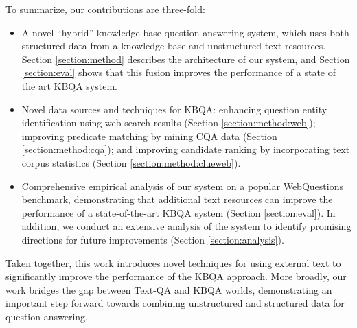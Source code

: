 To summarize, our contributions are three-fold:
\begin{itemize} %
\item A novel ``hybrid'' knowledge base question answering system, which uses both structured data from a knowledge base and unstructured text resources. Section \ref{section:method} describes the architecture of our system, and Section \ref{section:eval} shows that this fusion improves the performance of a state of the art KBQA system.
\item Novel data sources and techniques for KBQA: enhancing question entity identification using web search results (Section \ref{section:method:web}); improving predicate matching by mining CQA data (Section \ref{section:method:cqa}); and improving candidate ranking by incorporating text corpus statistics (Section \ref{section:method:clueweb}).
\item Comprehensive empirical analysis of our system on a popular WebQuestions benchmark, demonstrating that additional text resources can improve the performance of a state-of-the-art KBQA system (Section \ref{section:eval}). In addition, we conduct an extensive analysis of the system to identify promising directions for future improvements (Section \ref{section:analysis}).
\end{itemize}

Taken together, this work introduces novel techniques for using external text to significantly improve the performance of the KBQA approach.
More broadly, our work bridges the gap between Text-QA and KBQA worlds, demonstrating an important step forward towards combining unstructured and structured data for question answering.




